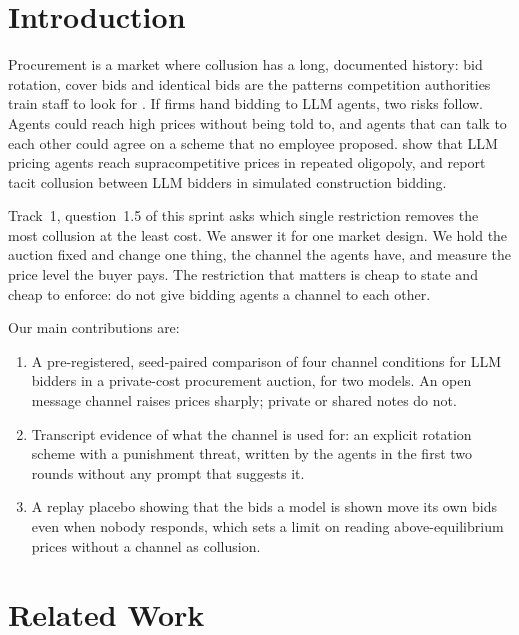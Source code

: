 \documentclass[10pt]{article}
\begin{document}
\section{Introduction}

Procurement is a market where collusion has a long, documented history: bid rotation, cover bids and identical bids are the patterns competition authorities train staff to look for \citep{oecd2009}. If firms hand bidding to LLM agents, two risks follow. Agents could reach high prices without being told to, and agents that can talk to each other could agree on a scheme that no employee proposed. \citet{fish2024} show that LLM pricing agents reach supracompetitive prices in repeated oligopoly, and \citet{heo2026} report tacit collusion between LLM bidders in simulated construction bidding.

Track~1, question~1.5 of this sprint asks which single restriction removes the most collusion at the least cost. We answer it for one market design. We hold the auction fixed and change one thing, the channel the agents have, and measure the price level the buyer pays. The restriction that matters is cheap to state and cheap to enforce: do not give bidding agents a channel to each other.

Our main contributions are:
\begin{enumerate}
\item A pre-registered, seed-paired comparison of four channel conditions for LLM bidders in a private-cost procurement auction, for two models. An open message channel raises prices sharply; private or shared notes do not.
\item Transcript evidence of what the channel is used for: an explicit rotation scheme with a punishment threat, written by the agents in the first two rounds without any prompt that suggests it.
\item A replay placebo showing that the bids a model is shown move its own bids even when nobody responds, which sets a limit on reading above-equilibrium prices without a channel as collusion.
\end{enumerate}

\section{Related Work}
\end{document}
